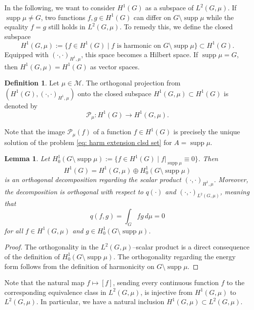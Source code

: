 \documentclass[reqno]{amsart}
\theoremstyle{plain}
\newtheorem{lem}[thm]{Lemma}
\theoremstyle{definition}
\newtheorem{defn}[thm]{Definition}
\theoremstyle{remark}
\numberwithin{equation}{section}
\newcommand{\cM}{\mathcal{M}}
\newcommand{\cP}{\mathcal{P}}   %
\newcommand{\supp}{\operatorname{supp}}
\begin{document}
In the following, we want to consider $H^1(G)$ as a subspace of $L^2(G, \mu)$. If $\supp\mu \neq G$, two functions $f,g \in H^1(G)$ can differ on $G\setminus \supp \mu$ while the equality $f =g$ still holds in $L^2(G, \mu)$. To remedy this, we define the closed subspace
\[
H^1(G, \mu) := \{f \in H^1(G) \; | \;  f \text{ is harmonic on } G\setminus \supp \mu  \} \subset H^1(G).
\]
Equipped with $(\cdot, \cdot)_{H^1, \mu}$, this space becomes a Hilbert space. If $\supp \mu = G$, then $H^1(G, \mu ) = H^1(G)$ as vector spaces. 


\begin{defn}
	Let $\mu \in \cM$. The orthogonal projection from $(H^1(G), (\cdot, \cdot)_{H^1, \mu})$ onto the closed subspace $H^1(G, \mu) \subset H^1(G)$ is denoted by 
	\[
	\cP_\mu : H^1(G) \to H^1(G, \mu). 
	\] 
\end{defn}
Note that the image $\cP_\mu(f)$ of a function $f\in H^1(G)$ is precisely the unique solution of the problem \eqref{eq: harm extension clsd set} for $A=\supp \mu$. 


\begin{lem}\label{lem:OrthoDecompositionH^1}
	Let $H^1_0(G \setminus \supp \mu) := \{f \in H^1(G) \; | \; f\big|_{ \supp \mu} \equiv 0  \}$. Then 
	\[
	H^1(G) = H^1(G, \mu) \oplus H^1_0(G \setminus \supp \mu)
	\]
	is an orthogonal decomposition regarding the scalar product $(\cdot, \cdot)_{H^1, \mu}$. Moreover, the decomposition is orthogonal with respect to $q(\cdot)$ and $(\cdot, \cdot)_{L^2(G,\mu)}$, meaning that
	\[
	q(f,g) = \int_G f g \, d\mu = 0
	\]
	for all $f \in H^1(G, \mu)$ and $g \in H^1_0(G \setminus \supp \mu)$.
\end{lem}
\begin{proof}
	The orthogonality in the $L^2(G, \mu)$--scalar product is a direct consequence of the definition of $H^1_0(G \setminus \supp \mu)$. The orthogonality regarding the energy form follows from the definition of harmonicity on $G \setminus \supp \mu$. 
\end{proof}

Note that the natural map $f \mapsto [f]$, sending every continuous function $f$ to the corresponding equivalence class in $L^2(G, \mu)$, is injective from $H^1(G, \mu)$ to $L^2(G, \mu)$. In particular, we have a natural inclusion $H^1(G, \mu)  \subset L^2(G, \mu)$.
\end{document}
